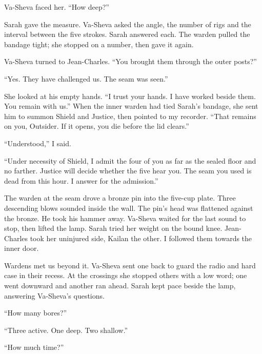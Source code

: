 Va-Sheva faced her. ``How deep?''\par

Sarah gave the measure. Va-Sheva asked the angle, the number of rigs and the interval between the five strokes. Sarah answered each. The warden pulled the bandage tight; she stopped on a number, then gave it again.\par

Va-Sheva turned to Jean-Charles. ``You brought them through the outer posts?''\par

``Yes. They have challenged us. The seam was seen.''\par

She looked at his empty hands. ``I trust your hands. I have worked beside them. You remain with us.'' When the inner warden had tied Sarah's bandage, she sent him to summon Shield and Justice, then pointed to my recorder. ``That remains on you, Outsider. If it opens, you die before the lid clears.''\par

``Understood,'' I said.\par

``Under necessity of Shield, I admit the four of you as far as the sealed floor and no farther. Justice will decide whether the five hear you. The seam you used is dead from this hour. I answer for the admission.''\par

The warden at the seam drove a bronze pin into the five-cup plate. Three descending blows sounded inside the wall. The pin's head was flattened against the bronze. He took his hammer away. Va-Sheva waited for the last sound to stop, then lifted the lamp. Sarah tried her weight on the bound knee. Jean-Charles took her uninjured side, Kailan the other. I followed them towards the inner door.\par

Wardens met us beyond it. Va-Sheva sent one back to guard the radio and hard case in their recess. At the crossings she stopped others with a low word; one went downward and another ran ahead. Sarah kept pace beside the lamp, answering Va-Sheva's questions.\par

``How many bores?''\par

``Three active. One deep. Two shallow.''\par

``How much time?''\par

